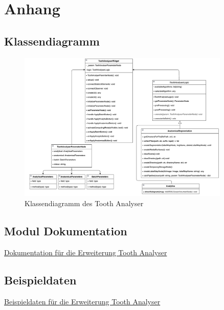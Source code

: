 \chapter{Anhang}
\label{chap:anhang}

\section{Klassendiagramm}
\begin{figure}[h]
	\centering
	\includegraphics[width=0.9\textwidth, angle=90]{img/toothAnalyserClasses.png}
	\caption{Klassendiagramm des Tooth Analyser}
	\label{fig:klassendiagramm_gesamt}
\end{figure}

\section{Modul Dokumentation}
\href{https://github.com/lukaskonietzka/SlicerToothAnalyser/tree/main}{Dokumentation
für die Erweiterung Tooth Analyser}

\section{Beispieldaten}
\href{https://github.com/lukaskonietzka/ToothAnalyserSampleData}{Beispieldaten
für die Erweiterung Tooth Analyser}
